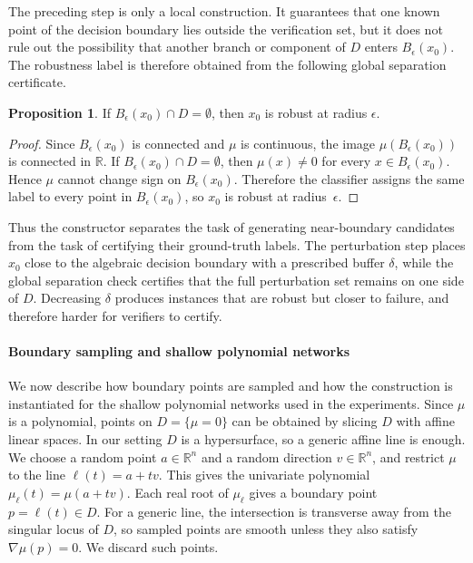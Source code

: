 \documentclass{article}
\theoremstyle{definition}
\newtheorem{proposition}[theorem]{Proposition}
\begin{document}
The preceding step is only a local construction. It guarantees that one known point of the decision boundary lies outside the verification set, but it does not rule out the possibility that another branch or component of $D$ enters $B_\epsilon(x_0)$. The robustness label is therefore obtained from the following global separation certificate.

\begin{proposition}
\label{prop:pnn-global-certificate}
If $B_\epsilon(x_0)\cap D=\emptyset$, then $x_0$ is robust at radius $\epsilon$.
\end{proposition}

\begin{proof}
Since $B_\epsilon(x_0)$ is connected and $\mu$ is continuous, the image $\mu(B_\epsilon(x_0))$ is connected in $\mathbb R$. If $B_\epsilon(x_0)\cap D=\emptyset$, then $\mu(x)\neq 0$ for every $x\in B_\epsilon(x_0)$. Hence $\mu$ cannot change sign on $B_\epsilon(x_0)$. Therefore the classifier assigns the same label to every point in $B_\epsilon(x_0)$, so $x_0$ is robust at radius~$\epsilon$.
\end{proof}

Thus the constructor separates the task of generating near-boundary candidates from the task of certifying their ground-truth labels. The perturbation step places $x_0$ close to the algebraic decision boundary with a prescribed buffer $\delta$, while the global separation check certifies that the full perturbation set remains on one side of $D$. Decreasing $\delta$ produces instances that are robust but closer to failure, and therefore harder for verifiers to certify.




\paragraph{Boundary sampling and shallow polynomial networks}
\label{app:pnn-sampling}

We now describe how boundary points are sampled and how the construction is instantiated for the shallow polynomial networks used in the experiments. Since $\mu$ is a polynomial, points on $D=\{\mu=0\}$ can be obtained by slicing $D$ with affine linear spaces. In our setting $D$ is a hypersurface, so a generic affine line is enough. We choose a random point $a\in\mathbb R^n$ and a random direction $v\in\mathbb R^n$, and restrict $\mu$ to the line $\ell(t)=a+tv$. This gives the univariate polynomial $\mu_\ell(t)=\mu(a+tv)$. Each real root of $\mu_\ell$ gives a boundary point $p=\ell(t)\in D$. For a generic line, the intersection is transverse away from the singular locus of $D$, so sampled points are smooth unless they also satisfy $\nabla\mu(p)=0$. We discard such points.
\end{document}
